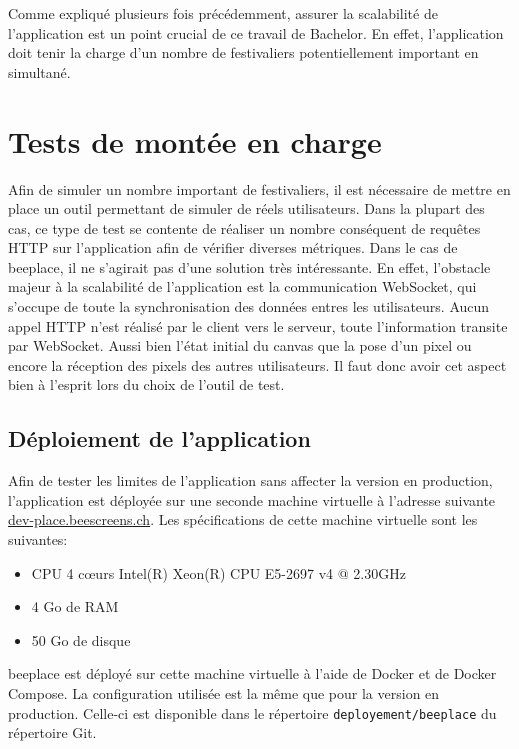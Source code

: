 Comme expliqué plusieurs fois précédemment, assurer la scalabilité de l'application est un point crucial de ce travail de Bachelor. En effet, l'application doit tenir la charge d'un nombre de festivaliers potentiellement important en simultané.

\section{Tests de montée en charge}

Afin de simuler un nombre important de festivaliers, il est nécessaire de mettre en place un outil permettant de simuler de réels utilisateurs. Dans la plupart des cas, ce type de test se contente de réaliser un nombre conséquent de requêtes HTTP sur l'application afin de vérifier diverses métriques. Dans le cas de \gls{beeplace}, il ne s'agirait pas d'une solution très intéressante. En effet, l'obstacle majeur à la scalabilité de l'application est la communication WebSocket, qui s'occupe de toute la synchronisation des données entres les utilisateurs. Aucun appel HTTP n'est réalisé par le client vers le serveur, toute l'information transite par WebSocket. Aussi bien l'état initial du canvas que la pose d'un pixel ou encore la réception des pixels des autres utilisateurs. Il faut donc avoir cet aspect bien à l'esprit lors du choix de l'outil de test.

\subsection{Déploiement de l'application}

Afin de tester les limites de l'application sans affecter la version en production, l'application est déployée sur une seconde machine virtuelle à l'adresse suivante \href{https://dev-place.beescreens.ch}{dev-place.beescreens.ch}. Les spécifications de cette machine virtuelle sont les suivantes:

\begin{itemize}
  \item CPU 4 c\oe{}urs Intel(R) Xeon(R) CPU E5-2697 v4 @ 2.30GHz
  \item 4 Go de RAM
  \item 50 Go de disque
\end{itemize}

\gls{beeplace} est déployé sur cette machine virtuelle à l'aide de Docker et de Docker Compose. La configuration utilisée est la même que pour la version en production. Celle-ci est disponible dans le répertoire \texttt{deployement/beeplace} du répertoire Git.

